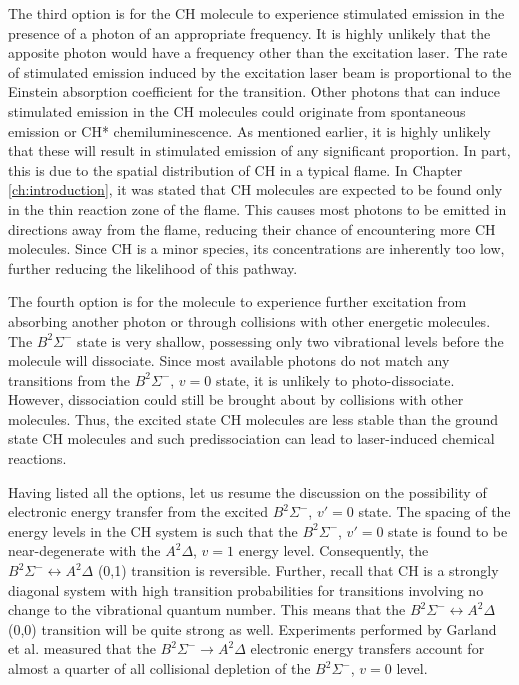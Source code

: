 The third option is for the CH molecule to experience stimulated emission in the presence of a photon of an appropriate frequency.
It is highly unlikely that the apposite photon would have a frequency other than the excitation laser.
The rate of stimulated emission induced by the excitation laser beam is proportional to the Einstein absorption coefficient for the transition.
Other photons that can induce stimulated emission in the CH molecules could originate from spontaneous emission or CH* chemiluminescence.
As mentioned earlier, it is highly unlikely that these will result in stimulated emission of any significant proportion.
In part, this is due to the spatial distribution of CH in a typical flame.
In Chapter \ref{ch:introduction}, it was stated that CH molecules are expected to be found only in the thin reaction zone of the flame.
This causes most photons to be emitted in directions away from the flame, reducing their chance of encountering more CH molecules.
Since CH is a minor species, its concentrations are inherently too low, further reducing the likelihood of this pathway.

The fourth option is for the molecule to experience further excitation from absorbing another photon or through collisions with other energetic molecules.
The \(B^2\Sigma^-\) state is very shallow, possessing only two vibrational levels before the molecule will dissociate.
Since most available photons do not match any transitions from the \(B^2\Sigma^-\), \(v=0\) state, it is unlikely to photo-dissociate.
However, dissociation could still be brought about by collisions with other molecules.
Thus, the excited state CH molecules are less stable than the ground state CH molecules and such predissociation can lead to laser-induced chemical reactions.

Having listed all the options, let us resume the discussion on the possibility of electronic energy transfer from the excited \(B^2\Sigma^-\), \(v'=0\) state.
The spacing of the energy levels in the CH system is such that the \(B^2\Sigma^-\), \(v'=0\) state is found to be near-degenerate with the \(A^2\Delta\), \(v=1\) energy level.
Consequently, the \(B^2\Sigma^-\leftrightarrow A^2\Delta\) (0,1) transition is reversible.
Further, recall that CH is a strongly diagonal system with high transition probabilities for transitions involving no change to the vibrational quantum number.
This means that the \(B^2\Sigma^-\leftrightarrow A^2\Delta\) (0,0) transition will be quite strong as well.
Experiments performed by Garland et al.\cite{1985-garland-b} measured that the \(B^2\Sigma^-\rightarrow A^2\Delta\) electronic energy transfers account for almost a quarter of all collisional depletion of the \(B^2\Sigma^-\), \(v=0\) level.

